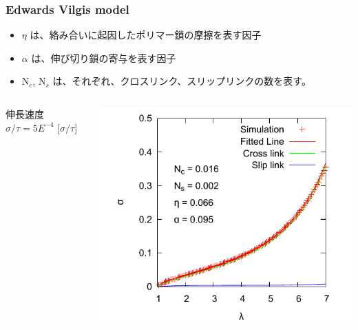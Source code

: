 \documentclass[11pt, dvipdfmx]{beamer}
\begin{document}
\begin{frame}
\frametitle{Edwards Vilgis model}

\footnotesize
\begin{itemize}
\item
$\eta$ は、絡み合いに起因したポリマー鎖の摩擦を表す因子
\item
$\alpha$ は、伸び切り鎖の寄与を表す因子
\item
N$_c$, N$_s$ は、それぞれ、クロスリンク、スリップリンクの数を表す。
\end{itemize}

\vspace{-3mm}


\begin{columns}[totalwidth=1\textwidth]
\begin{center}
伸長速度 $\sigma/\tau = 5E^{-4}$ [$\sigma/\tau$]
\end{center}
\vspace{-3mm}
\includegraphics[width=\columnwidth]{./fig/E_V.pdf}


\end{columns}
\end{frame}
\end{document}
